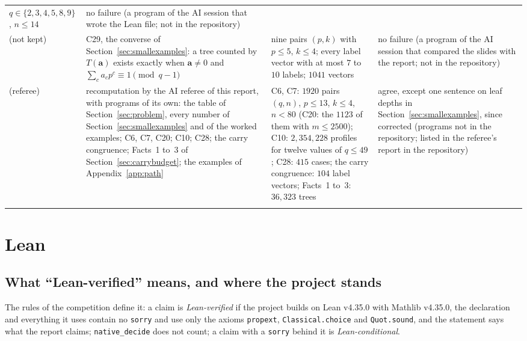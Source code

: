 \documentclass[11pt]{article}
\theoremstyle{definition}
\theoremstyle{remark}
\numberwithin{equation}{section}
\numberwithin{figure}{section}
\begin{document}
{\begin{longtable}{@{}>{\raggedright\arraybackslash}p{}>{\raggedright\arraybackslash}p{}>{\raggedright\arraybackslash}p{}>{\raggedright\arraybackslash}p{}@{}}
 $q\in\{2,3,4,5,8,9\}$, $n\le14$ & no failure (a program of the AI session that wrote the Lean file; not in
 the repository)\\\addlinespace[3pt]
(not kept) & C29, the converse of Section~\ref{sec:smallexamples}: a tree counted by $T(\mathbf a)$ exists
 exactly when $\mathbf a\ne0$ and $\sum_ca_cp^c\equiv1\pmod{q-1}$ & nine pairs $(p,k)$ with $p\le5$, $k\le4$;
 every label vector with at most $7$ to $10$ labels; $1041$ vectors & no failure (a program of the AI session
 that compared the slides with the report; not in the repository)\\\addlinespace[3pt]
(referee) & recomputation by the AI referee of this report, with programs of its own: the table of
 Section~\ref{sec:problem}, every number of Section~\ref{sec:smallexamples} and of the worked examples; C6,
 C7, C20; C10; C28; the carry congruence; Facts~1 to~3 of Section~\ref{sec:carrybudget}; the examples of
 Appendix~\ref{app:path}
 & C6, C7: $1920$ pairs $(q,n)$, $p\le13$, $k\le4$, $n<80$ (C20: the $1123$ of them with $m\le2500$); C10:
 $2{,}354{,}228$ profiles for twelve values of $q\le49$; C28: $415$ cases; the carry congruence: $104$ label
 vectors; Facts~1 to~3: $36{,}323$ trees
 & agree, except one sentence on leaf depths in Section~\ref{sec:smallexamples}, since corrected (programs not
 in the repository; listed in the referee's report in the repository)\\\addlinespace[3pt]
\end{longtable}}


\section{Lean}\label{sec:lean}
\subsection{What ``Lean-verified'' means, and where the project stands}
The rules of the competition define it: a claim is \emph{Lean-verified} if the project builds on Lean v4.35.0
with Mathlib v4.35.0, the declaration and everything it uses contain no \texttt{sorry} and use only the axioms
\texttt{propext}, \texttt{Classical.choice} and \texttt{Quot.sound}, and the statement says what the report
claims; \texttt{native\_decide} does not count; a claim with a \texttt{sorry} behind it is
\emph{Lean-conditional}.
\end{document}
